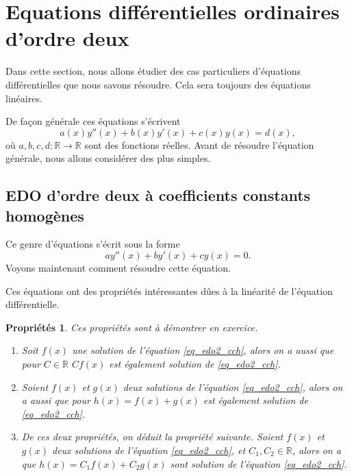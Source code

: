 \documentclass[a4paper,12pt]{book}
\newcommand{\real}{\mathbb{R}}
\renewcommand{\eqref}[1]{\ref{#1}}
\newtheorem{proprietes}{Propriétés}
\begin{document}
\section{Equations différentielles ordinaires d'ordre deux}

Dans cette section, nous allons étudier des cas particuliers d'équations différentielles que nous savons résoudre.
Cela sera toujours des équations linéaires.

De façon générale ces équations s'écrivent
\begin{equation}
 a(x)y''(x)+b(x)y'(x)+c(x)y(x)=d(x),
\end{equation}
où $a,b,c,d:\real\rightarrow\real$ sont des fonctions réelles. Avant de résoudre l'équation générale, nous
allons considérer des plus simples.

\subsection{EDO d'ordre deux à coefficients constants homogènes}

Ce genre d'équations s'écrit sous la forme
\begin{equation}
 a y''(x)+by'(x)+cy(x)=0.\label{eq_edo2_cch}
\end{equation}
Voyons maintenant comment résoudre cette équation.

Ces équations ont des propriétés intéressantes dûes à la linéarité 
de l'équation différentielle.
\begin{proprietes}
Ces propriétés sont à démontrer en exercice.
 \begin{enumerate}
  \item Soit $f(x)$ une solution de l'équation \eqref{eq_edo2_cch}, alors on a aussi que pour $C\in\real$ $Cf(x)$ est également solution de \eqref{eq_edo2_cch}.
  \item Soient $f(x)$ et $g(x)$ deux solutions de l'équation \eqref{eq_edo2_cch}, alors on a aussi que pour $h(x)=f(x)+g(x)$ est également solution de \eqref{eq_edo2_cch}.
  \item De ces deux propriétés, on déduit la propriété suivante. Soient $f(x)$ et $g(x)$ deux solutions de l'équation \eqref{eq_edo2_cch}, et $C_1,C_2\in\real$, alors on a que $h(x)=C_1f(x)+C_2g(x)$ sont solution de l'équation \eqref{eq_edo2_cch}.
 \end{enumerate}
\end{proprietes}
\end{document}
